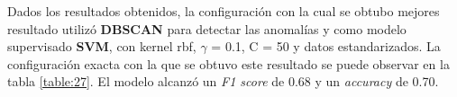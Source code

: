 	Dados los resultados obtenidos, la configuración con la cual se obtubo mejores resultado utilizó \textbf{DBSCAN} para detectar las anomalías y como modelo
	supervisado \textbf{SVM}, con kernel rbf, $\gamma$ = 0.1, C = 50  y datos estandarizados. La configuración exacta con la que se obtuvo este resultado se
	puede observar en la tabla \ref{table:27}. El modelo alcanzó un \emph{F1 score} de 0.68 y un \emph{accuracy} de 0.70.
